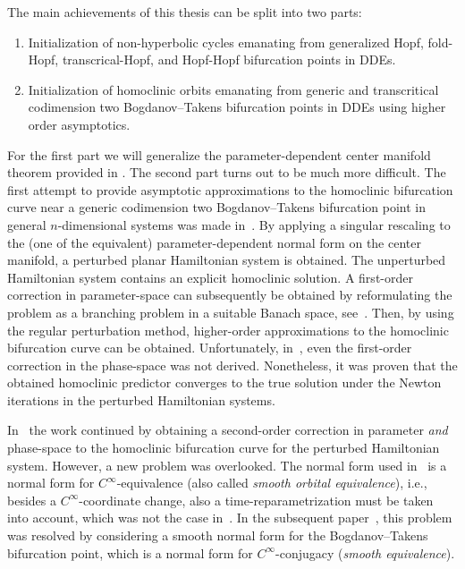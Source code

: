 The main achievements of this thesis can be split into two parts:
\begin{enumerate}[label=\Roman*.]
    \item Initialization of non-hyperbolic cycles emanating from generalized
        Hopf, fold-Hopf, transcrical-Hopf, and Hopf-Hopf bifurcation points in DDEs.
    \item Initialization of homoclinic orbits emanating from generic and transcritical
        codimension two Bogdanov--Takens bifurcation points in DDEs using higher order
        asymptotics.
\end{enumerate}

For the first part we will generalize the parameter-dependent center manifold
theorem provided in \cite{diekmann1995delay}. The second part turns out to be
much more difficult. The first attempt to provide asymptotic approximations to the
homoclinic bifurcation curve near a generic codimension two Bogdanov--Takens
bifurcation point in general $n$-dimensional systems was made
in~\cite{Beyn_1994}. By applying a singular rescaling to the (one of the
equivalent) parameter-dependent normal form on the center manifold, a perturbed
planar Hamiltonian system is obtained. The unperturbed Hamiltonian system
contains an explicit homoclinic solution. A first-order correction in
parameter-space can subsequently be obtained by reformulating the problem as a
branching problem in a suitable Banach space, see~\cite{Beyn_1994}.  Then, by
using the regular perturbation method, higher-order approximations to the
homoclinic bifurcation curve can be obtained. Unfortunately, in~\cite{Beyn_1994},
even the first-order correction in the phase-space was not derived.  Nonetheless,
it was proven that the obtained homoclinic predictor converges to the true
solution under the Newton iterations in the perturbed Hamiltonian systems.

In~\cite{Kuznetsov2014improved} the work continued by obtaining a second-order
correction in parameter \emph{and} phase-space to the homoclinic bifurcation
curve for the perturbed Hamiltonian system. However, a new problem was
overlooked.  The normal form used in~\cite{Kuznetsov2014improved} is a normal
form for $C^\infty$-equivalence (also called \emph{smooth orbital equivalence}),
i.e., besides a $C^\infty$-coordinate change, also a time-reparametrization must
be taken into account, which was not the case in~\cite{Kuznetsov2014improved}. In
the subsequent paper~\cite{Gray-Scott2015}, this problem was resolved by
considering a smooth normal form for the Bogdanov--Takens bifurcation point,
which is a normal form for $C^\infty$-conjugacy (\emph{smooth equivalence}). 

